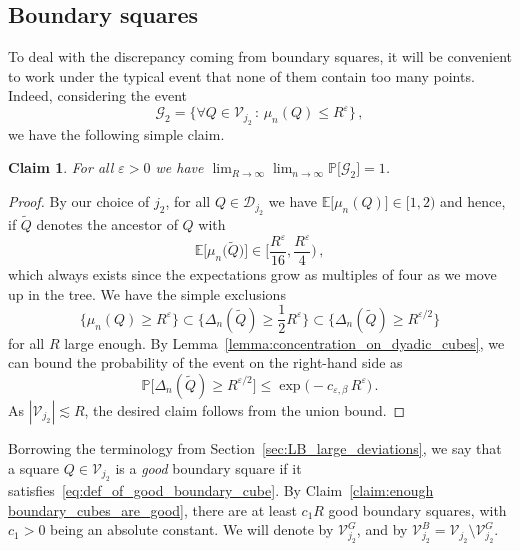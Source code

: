\documentclass[11pt]{amsart}
\newtheorem{claim}[theorem]{Claim}
\theoremstyle{definition}
\theoremstyle{remark}
\numberwithin{equation}{section}
\def\eps{{\varepsilon}}
\newcommand{\bP}{\mathbb P}
\newcommand{\bE}{\mathbb E}
\begin{document}
	\subsection{Boundary squares}
	To deal with the discrepancy coming from boundary squares, it will be convenient to work under the typical event that none of them contain too many points. Indeed, considering the event
	\begin{equation}
		\label{eq:moderate_deviations_lower_bound_boundary_cubes_are_typical}
		\mathcal{G}_2 = \Big\{ \forall Q\in \mathcal{V}_{j_2} \, : \, \mu_n(Q) \le R^{\eps} \Big\}\, ,
	\end{equation}
	we have the following simple claim.
	\begin{claim}
		\label{claim:moderate_deviations_lower_bound_boundary_cubes_are_typical_with_high_probability}
		For all $\eps>0$ we have $\displaystyle \lim_{R\to \infty} \lim_{n\to \infty} \bP\big[\mathcal{G}_2\big] = 1$.
	\end{claim}
	\begin{proof}
		By our choice of $j_2$, for all $Q\in \mathcal{D}_{j_2}$ we have
		$
		\bE\big[\mu_n(Q)\big] \in [1,2)
		$
		and hence, if $\widetilde{Q}$ denotes the ancestor of $Q$ with 
		\[
		\bE\big[\mu_n\big(\widetilde{Q}\big)\big]\in \Big[\frac{R^{\eps}}{16},\frac{R^{\eps}}{4}\Big) \, ,
		\]
		which always exists since the expectations grow as multiples of four as we move up in the tree. We have the simple exclusions
		\[
		\Big\{ \mu_n(Q) \ge R^{\eps} \Big\} \subset \Big\{ \Delta_{n}(\widetilde{Q}) \ge \frac{1}{2}R^{\eps} \Big\} \subset \Big\{ \Delta_{n}(\widetilde{Q}) \ge R^{\eps/2} \Big\}
		\]
		for all $R$ large enough. By Lemma~\ref{lemma:concentration_on_dyadic_cubes}, we can bound the probability of the event on the right-hand side as
		\[
		\bP\Big[\Delta_{n}(\widetilde{Q}) \ge R^{\eps/2} \Big] \le \exp\Big(-c_{\eps,\beta} \, R^{\eps}\Big) \, .
		\]
		As $|\mathcal{V}_{j_2}| \lesssim R$, the desired claim follows from the union bound.
	\end{proof}
	Borrowing the terminology from Section~\ref{sec:LB_large_deviations}, we say that a square $Q\in \mathcal{V}_{j_2}$ is a \emph{good} boundary square if it satisfies~\eqref{eq:def_of_good_boundary_cube}. By Claim~\ref{claim:enough boundary_cubes_are_good}, there are at least
	$
	c_1 R
	$
	good boundary squares, with $c_1>0$ being an absolute constant.
	We will denote by $\mathcal{V}_{j_2}^{G}$, and by $\mathcal{V}_{j_2}^B = \mathcal{V}_{j_2} \setminus \mathcal{V}_{j_2}^G$. 
	
\end{document}
